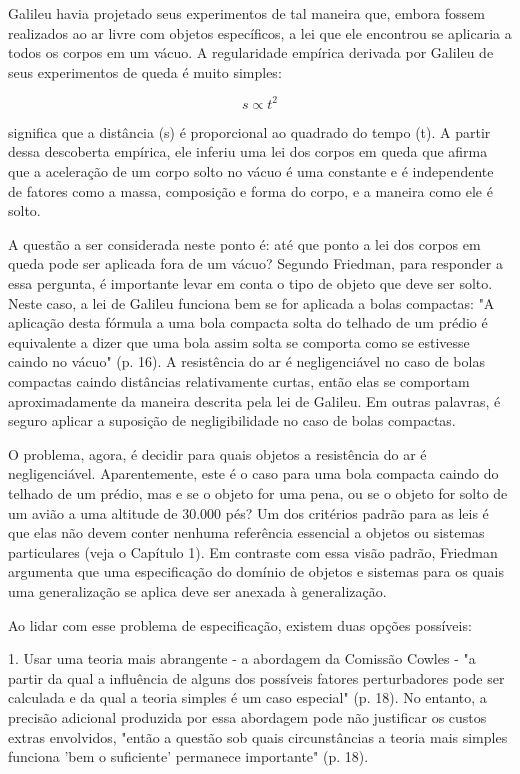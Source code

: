 \documentclass[12pt]{article}
\begin{document}
Galileu havia projetado seus experimentos de tal maneira que, embora fossem realizados ao ar livre com objetos específicos, a lei que ele encontrou se aplicaria a todos os corpos em um vácuo. A regularidade empírica derivada por Galileu de seus experimentos de queda é muito simples:

$$s \propto t^2$$

significa que a distância (s) é proporcional ao quadrado do tempo (t). A partir dessa descoberta empírica, ele inferiu uma lei dos corpos em queda que afirma que a aceleração de um corpo solto no vácuo é uma constante e é independente de fatores como a massa, composição e forma do corpo, e a maneira como ele é solto.

A questão a ser considerada neste ponto é: até que ponto a lei dos corpos em queda pode ser aplicada fora de um vácuo? Segundo Friedman, para responder a essa pergunta, é importante levar em conta o tipo de objeto que deve ser solto. Neste caso, a lei de Galileu funciona bem se for aplicada a bolas compactas: "A aplicação desta fórmula a uma bola compacta solta do telhado de um prédio é equivalente a dizer que uma bola assim solta se comporta como se estivesse caindo no vácuo" (p. 16). A resistência do ar é negligenciável no caso de bolas compactas caindo distâncias relativamente curtas, então elas se comportam aproximadamente da maneira descrita pela lei de Galileu. Em outras palavras, é seguro aplicar a suposição de negligibilidade no caso de bolas compactas.

O problema, agora, é decidir para quais objetos a resistência do ar é negligenciável. Aparentemente, este é o caso para uma bola compacta caindo do telhado de um prédio, mas e se o objeto for uma pena, ou se o objeto for solto de um avião a uma altitude de 30.000 pés? Um dos critérios padrão para as leis é que elas não devem conter nenhuma referência essencial a objetos ou sistemas particulares (veja o Capítulo 1). Em contraste com essa visão padrão, Friedman argumenta que uma especificação do domínio de objetos e sistemas para os quais uma generalização se aplica deve ser anexada à generalização.

Ao lidar com esse problema de especificação, existem duas opções possíveis:

1. Usar uma teoria mais abrangente - a abordagem da Comissão Cowles - "a partir da qual a influência de alguns dos possíveis fatores perturbadores pode ser calculada e da qual a teoria simples é um caso especial" (p. 18). No entanto, a precisão adicional produzida por essa abordagem pode não justificar os custos extras envolvidos, "então a questão sob quais circunstâncias a teoria mais simples funciona 'bem o suficiente' permanece importante" (p. 18).
\end{document}

